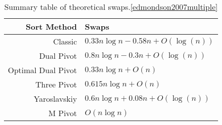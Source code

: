 		\begin{table}
			\begin{center}
				\begin{tabular}{|r|l|}
					\hline
					Sort Method         &     Swaps \\ \hline \hline
					Classic             &  $0.33n \log n - 0.58n + O(\log(n))$ \\ \hline
					Dual Pivot          &  $0.8n \log n -0.3n + O(\log(n))$    \\ \hline
					Optimal Dual Pivot  &  $0.33n \log n + O(n)$               \\ \hline
					Three Pivot         &  $0.615n \log n + O(n)$              \\ \hline
					Yaroslavskiy        &  $0.6n \log n + 0.08n + O(\log(n))$  \\ \hline
					M Pivot             &  $O(n \log n)$                       \\ \hline
				\end{tabular}
				\caption{Summary table of theoretical swaps.\ref{edmondson2007multiple}\cite{kushagra2013multi}\cite{Aumuller:2013:OPD:2525857.2525862}\cite{Wild:2012:ACA:2404160.2404231}}
				\label{tab:SwapSummary}
			\end{center}
		\end{table}